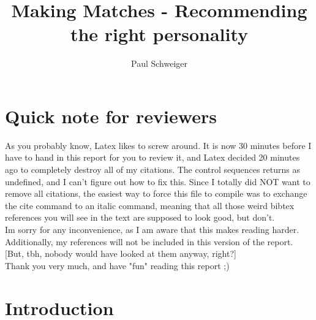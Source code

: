 \documentclass[nochapterpage,bigchapter,linedtoc,longdoc,colorback,accentcolor=tud3b,oneside]{tudreport}
\title{Making Matches - Recommending the right personality}
\subtitle{Paul Schweiger}
\begin{document}
\maketitle


\chapter{Quick note for reviewers}
As you probably know, Latex likes to screw around. It is now 30 minutes before I have to hand in this report for you to review it, and Latex decided 20 minutes ago to completely destroy all of my citations. The control sequences returns as undefined, and I can't figure out how to fix this. Since I totally did NOT want to remove all citations, the easiest way to force this file to compile was to exchange the cite command to an italic command, meaning that all those weird bibtex references you will see in the text are supposed to look good, but don't.\\
Im sorry for any inconvenience, as I am aware that this makes reading harder. Additionally, my references will not be included in this version of the report. [But, tbh, nobody would have looked at them anyway, right?]\\
Thank you very much, and have "fun" reading this report ;)


\chapter{Introduction}


\renewcommand{\cleardoublepage}{}
\renewcommand{\clearpage}{}








\end{document}
